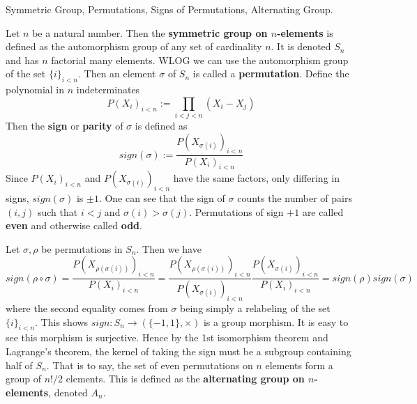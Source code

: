 \documentclass[../book.tex]{subfiles}
\begin{document}
\begin{dfn} Symmetric Group, Permutations, 
Signs of Permutations, Alternating Group. 
    
    Let $n$ be a natural number. 
    Then the \textbf{symmetric group on $n$-elements} is defined as
    the automorphism group of any set of cardinality $n$. 
    It is denoted $S_n$ and has $n$ factorial many elements. 
    WLOG we can use the automorphism group of the set $\{i\}_{i<n}$.
    Then an element $\sigma$ of $S_n$ is called a \textbf{permutation}.
    Define the polynomial in $n$ indeterminates
    \[
        P(X_i)_{i<n} := \prod_{i<j<n} (X_i - X_j)
    \]
    Then the \textbf{sign} or \textbf{parity} of $\sigma$ is defined as \[
        sign(\sigma) := \frac{P(X_{\sigma(i)})_{i<n}}{P(X_i)_{i<n}}
    \]
    Since $P(X_i)_{i<n}$ and $P(X_{\sigma(i)})_{i<n}$ have the same factors,
    only differing in signs, $sign(\sigma)$ is $\pm 1$. 
    One can see that the sign of $\sigma$ counts
    the number of pairs $(i,j)$ such that $i < j$ and $\sigma(i) > \sigma(j)$. 
    Permutations of sign $+1$ are called \textbf{even} 
    and otherwise called \textbf{odd}.
    
    Let $\sigma, \rho$ be permutations in $S_n$. 
    Then we have \[
        sign(\rho \circ \sigma) = \frac{P(X_{\rho(\sigma(i))})_{i<n}}{P(X_i)_{i<n}}
        = \frac{P(X_{\rho(\sigma(i))})_{i<n}}{P(X_{\sigma(i)})_{i<n}}
        \frac{P(X_{\sigma(i)})_{i<n}}{P(X_i)_{i<n}} 
        = sign(\rho) sign(\sigma)
    \]
    where the second equality comes from $\sigma$ being simply
    a relabeling of the set $\{i\}_{i<n}$. 
    This shows $sign : S_n \to (\{-1,1\},\times)$ is a group morphism. 
    It is easy to see this morphism is surjective. 
    Hence by the 1st isomorphism theorem and Lagrange's theorem, 
    the kernel of taking the sign must be a subgroup containing half of $S_n$. 
    That is to say, the set of even permutations on $n$ elements
    form a group of $n!/2$ elements.
    This is defined as the \textbf{alternating group on $n$-elements}, denoted $A_n$.
    
\end{dfn}
\end{document}
